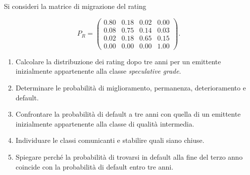 \begin{exercise}
Si consideri la matrice di migrazione del rating

\[
P_R
=
\begin{pmatrix}
0.80 & 0.18 & 0.02 & 0.00\\
0.08 & 0.75 & 0.14 & 0.03\\
0.02 & 0.18 & 0.65 & 0.15\\
0.00 & 0.00 & 0.00 & 1.00
\end{pmatrix}.
\]

\begin{enumerate}

\item Calcolare la distribuzione dei rating dopo tre anni per un
emittente inizialmente appartenente alla classe \emph{speculative
grade}.

\item Determinare le probabilit\`{a} di miglioramento, permanenza,
deterioramento e default.

\item Confrontare la probabilit\`{a} di default a tre anni con quella
di un emittente inizialmente appartenente alla classe di qualit\`{a}
intermedia.

\item Individuare le classi comunicanti e stabilire quali siano chiuse.

\item Spiegare perch\'{e} la probabilit\`{a} di trovarsi in default
alla fine del terzo anno coincide con la probabilit\`{a} di default
entro tre anni.
\end{enumerate}
\end{exercise}

